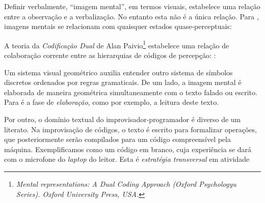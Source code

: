 Definir verbalmente, ``imagem mental'', em termos visuais, estabelece uma relação entre a observação e a verbalização. No entanto esta não é a única relação. Para , imagens mentais se relacionam com quaisquer estados quase-perceptuais: 

A teoria da \emph{Codificação Dual} de Alan Paivio\footnote{\emph{Mental representations: A Dual Coding Approach (Oxford Psychologyu Series). Oxford University Press, USA.}} \cite[p.~25--29]{McLean2011} estabelece uma relação de colaboração corrente entre as hierarquias de códigos de percepção: :

\begin{citacao}
\end{citacao}

Um sistema visual geométrico auxilia entender outro sistema de símbolos discretos ordenados por regras gramaticais. De um lado, a imagem mental é elaborada de maneira geométrica simultaneamente com o texto falado ou escrito. Para  é a fase de \emph{elaboração}, como por exemplo, a leitura deste texto. 

Por outro, o domínio textual do improvisador-programador é diverso de um literato. Na improvisação de códigos, o texto é escrito para formalizar operações, que posteriormente serão compilados para um código compreensível pela máquina. Exemplificamos como um código em branco, cuja experiência se dará com o microfone do \emph{laptop} do leitor. Esta é \emph{estratégia transversal} em atividade 

